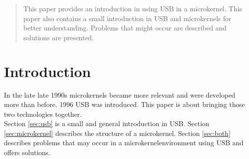 \documentclass{acm_proc_article-sp}
\begin{document}
\maketitle
\begin{abstract}
This paper provides an introduction in using USB in a microkernel.
This paper also contains a small introduction in USB and microkernels for better understanding. Problems that might occur are described and solutions are presented.


\end{abstract}



\section{Introduction}
In the late late 1990s microkernels became more relevant and were developed more than before. \cite{wiki3}
1996 USB was introduced. \cite{wiki} \cite{wiki2}
This paper is about bringing those two technologies together.\\
Section \ref{sec:usb} is a small and general introduction in USB.
Section \ref{sec:microkernel} describes the structure of a microkernel.
Section \ref{sec:both} describes problems that may occur in a microkernelenvironment using USB and offers solutions.
\end{document}
